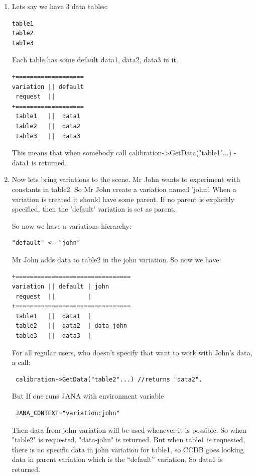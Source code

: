 \documentclass{article}
\begin{document}
\begin{enumerate} 
\item Lets say we have 3 data tables:
\begin{verbatim}
table1 
table2 
table3
\end{verbatim}
Each table has some default data1, data2, data3 in it. 
\begin{verbatim}
+===================
variation || default
 request  ||
+===================
 table1   ||  data1
 table2   ||  data2
 table3   ||  data3
\end{verbatim}
 
This means that when somebody call 
calibration->GetData("table1"...)  - data1 is returned. 

\item Now lets bring variations to the scene. Mr John wants to experiment with 
constants in table2. So Mr John create a variation named 'john'. 
When a variation is created it should have some parent. If no parent is 
explicitly specified, then the 'default' variation is set as parent. 

So now we have a variations hierarchy:
\begin{verbatim}
"default" <- "john" 
\end{verbatim}

Mr John adds data to table2 in the john variation.  So now we have:
\begin{verbatim}
+================================
variation || default | john
 request  ||         |
+================================
 table1   ||  data1  |
 table2   ||  data2  | data-john
 table3   ||  data3  |
\end{verbatim}
 
For all regular users, who doesn't specify that want to work with John's data, a call:
\begin{verbatim}
 calibration->GetData("table2"...) //returns "data2".
\end{verbatim}

But If one runs JANA with environment variable
\begin{verbatim}
 JANA_CONTEXT="variation:john"
\end{verbatim}

Then data from john variation will be used whenever it is possible. 
So when "table2" is requested, "data-john" is returned. But when table1 is requested, 
there is no specific data in john variation for table1, so CCDB goes looking data in parent 
variation which is the ``default'' variation. So data1 is returned. 


\end{enumerate}
\end{document}
